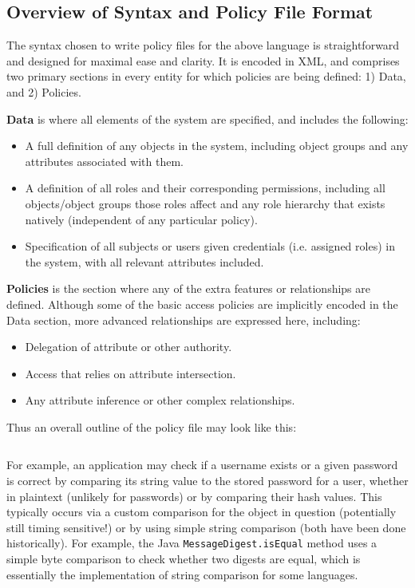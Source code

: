 \documentclass{article}
\providecommand{\inlinecode}{\texttt}
\begin{document}
\subsection{Overview of Syntax and Policy File Format}
The syntax chosen to write policy files for the above language is straightforward and designed for maximal ease and clarity. It is encoded in XML, and comprises two primary sections in every entity for which policies are being defined: 1) Data, and 2) Policies. \par
\textbf{Data} is where all elements of the system are specified, and includes the following: \\
\begin{itemize}
  \item A full definition of any objects in the system, including object groups and any attributes associated with them.
  \item A definition of all roles and their corresponding permissions, including all objects/object groups those roles affect and any role hierarchy that exists natively (independent of any particular policy).
  \item Specification of all subjects or users given credentials (i.e. assigned roles) in the system, with all relevant attributes included.
\end{itemize}
\textbf{Policies} is the section where any of the extra features or relationships are defined. Although some of the basic access policies are implicitly encoded in the Data section, more advanced relationships are expressed here, including: \\
\begin{itemize}
  \item Delegation of attribute or other authority.
  \item Access that relies on attribute intersection.
  \item Any attribute inference or other complex relationships.
\end{itemize}

Thus an overall outline of the policy file may look like this: \\
\begin{lstlisting}

\end{lstlisting}
For example, an application may check if a username exists or a given password is correct by comparing its string value to the stored password for a user, whether in plaintext (unlikely for passwords) or by comparing their hash values. This typically occurs via a custom comparison for the object in question (potentially still timing sensitive!) or by using simple string comparison (both have been done historically). \cite{codahale} For example, the Java \inlinecode{MessageDigest.isEqual} method uses a simple byte comparison to check whether two digests are equal, which is essentially the implementation of string comparison for some languages.
\end{document}
